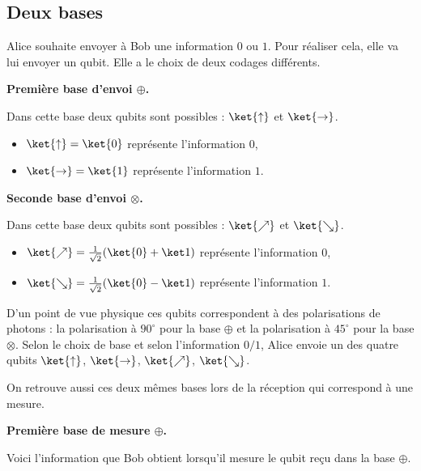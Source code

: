 \documentclass[11pt,class=report,crop=false]{standalone}
\begin{document}
\subsection{Deux bases}

Alice souhaite envoyer à Bob une information $0$ ou $1$. Pour réaliser cela, elle va lui envoyer un qubit. Elle a le choix de deux codages différents.

\medskip

\textbf{Première base d'envoi \og{}$\oplus$\fg{}.}

Dans cette base deux qubits sont possibles : $\ket{\uparrow}$ et $\ket{\rightarrow}$.

\begin{itemize}
  \item $\ket{\uparrow} = \ket{0}$ représente l'information $0$,
  \item $\ket{\rightarrow} = \ket{1}$ représente l'information $1$.
\end{itemize}

\medskip

\textbf{Seconde base d'envoi \og{}$\otimes$\fg{}.}

Dans cette base deux qubits sont possibles : $\ket{\nearrow}$ et $\ket{\searrow}$.

\begin{itemize}
  \item $\ket{\nearrow} = \frac{1}{\sqrt2}(\ket{0}+\ket1)$ représente l'information $0$,
  \item $\ket{\searrow} = \frac{1}{\sqrt2}(\ket{0}-\ket1)$ représente l'information $1$.
\end{itemize}

\medskip

D'un point de vue physique ces qubits correspondent à des polarisations de photons : la polarisation à $90^\circ$ pour la base \og{}$\oplus$\fg{} et la polarisation à $45^\circ$ pour la base \og{}$\otimes$\fg{}.
Selon le choix de base et selon l'information $0/1$, Alice envoie un des quatre qubits $\ket{\uparrow}$, $\ket{\rightarrow}$, $\ket{\nearrow}$, $\ket{\searrow}$.


\medskip

On retrouve aussi ces deux mêmes bases lors de la réception qui correspond à une mesure.

\medskip

\textbf{Première base de mesure  \og{}$\oplus$\fg{}.}

Voici l'information que Bob obtient lorsqu'il mesure le qubit reçu dans la base \og{}$\oplus$\fg{}.
\end{document}
